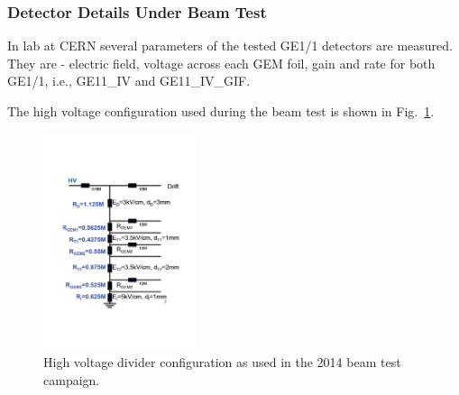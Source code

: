 \subsubsection{Detector Details Under Beam Test} %
\label{ssub:detector_details_under_beam_test}
In lab at CERN several parameters of the tested GE1/1 detectors are measured.
They are - electric field, voltage across each GEM foil, gain and rate for both GE1/1, i.e., GE11\_IV and GE11\_IV\_GIF.

The high voltage configuration used during the beam test is shown in Fig.~\ref{fig:HV_configuration}. 
\begin{figure}[!htbp]
    \centering
    \includegraphics[width=0.40\textwidth]{figures/GEM/HV_divider_gem_testbeam_2014.pdf}
    \caption{High voltage divider configuration as used in the 2014 beam test campaign.}
    \label{fig:HV_configuration}
\end{figure}

